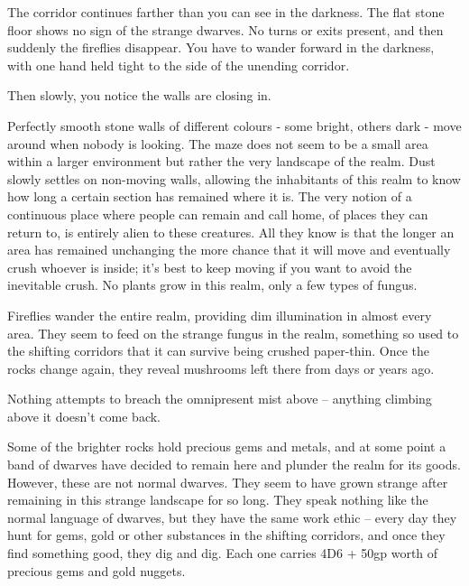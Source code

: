 \begin{multicols}{2}

\begin{boxtext}
	The corridor continues farther than you can see in the darkness.  The flat stone floor shows no sign of the strange dwarves.  No turns or exits present, and then suddenly the fireflies disappear.  You have to wander forward in the darkness, with one hand held tight to the side of the unending corridor.

	Then slowly, you notice the walls are closing in.

\end{boxtext}

Perfectly smooth stone walls of different colours - some bright, others dark - move around when nobody is looking.  The maze does not seem to be a small area within a larger environment but rather the very landscape of the realm.  Dust slowly settles on non-moving walls, allowing the inhabitants of this realm to know how long a certain section has remained where it is.  The very notion of a continuous place where people can remain and call home, of places they can return to, is entirely alien to these creatures.  All they know is that the longer an area has remained unchanging the more chance that it will move and eventually crush whoever is inside; it's best to keep moving if you want to avoid the inevitable crush.  No plants grow in this realm, only a few types of fungus.

Fireflies wander the entire realm, providing dim illumination in almost every area.  They seem to feed on the strange fungus in the realm, something so used to the shifting corridors that it can survive being crushed paper-thin.  Once the rocks change again, they reveal mushrooms left there from days or years ago.

Nothing attempts to breach the omnipresent mist above -- anything climbing above it doesn't come back.

Some of the brighter rocks hold precious gems and metals, and at some point a band of dwarves have decided to remain here and plunder the realm for its goods.  However, these are not normal dwarves.  They seem to have grown strange after remaining in this strange landscape for so long.  They speak nothing like the normal language of dwarves, but they have the same work ethic -- every day they hunt for gems, gold or other substances in the shifting corridors, and once they find something good, they dig and dig.  Each one carries 4D6 + 50gp worth of precious gems and gold nuggets.


\end{multicols}
